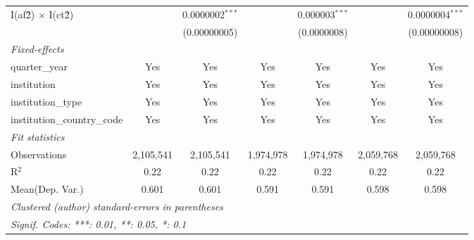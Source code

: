 \begin{tabular}{lcccccc}
   I(af\^2) $\times$ I(ct\^2)         &               & 0.0000002$^{***}$ &               & 0.000003$^{***}$ &               & 0.0000004$^{***}$\\   
                                      &               & (0.00000005)      &               & (0.0000008)      &               & (0.00000008)\\   
   \midrule
   \emph{Fixed-effects}\\
   quarter\_year                      & Yes           & Yes               & Yes           & Yes              & Yes           & Yes\\  
   institution                        & Yes           & Yes               & Yes           & Yes              & Yes           & Yes\\  
   institution\_type                  & Yes           & Yes               & Yes           & Yes              & Yes           & Yes\\  
   institution\_country\_code         & Yes           & Yes               & Yes           & Yes              & Yes           & Yes\\  
   \midrule
   \emph{Fit statistics}\\
   Observations                       & 2,105,541     & 2,105,541         & 1,974,978     & 1,974,978        & 2,059,768     & 2,059,768\\  
   R$^2$                              & 0.22          & 0.22              & 0.22          & 0.22             & 0.22          & 0.22\\  
Mean(Dep. Var.) & 0.601 & 0.601 & 0.591 & 0.591 & 0.598 & 0.598 \\
   \midrule \midrule
   \multicolumn{7}{l}{\emph{Clustered (author) standard-errors in parentheses}}\\
   \multicolumn{7}{l}{\emph{Signif. Codes: ***: 0.01, **: 0.05, *: 0.1}}\\
\end{tabular}
\par\endgroup
